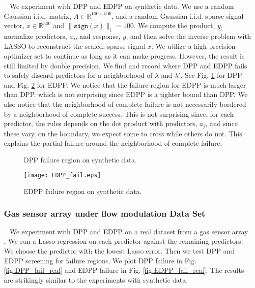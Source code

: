 \documentclass{article}
\begin{document}
\qquad ~ We experiment with DPP and EDPP on synthetic data. We use a random Gaussian i.i.d. matrix, $A\in \mathbb{R}^{100 \times 500}$, and a random Gaussian i.i.d. sparse signal vector, $x\in \mathbb{R}^{500}$ and $\|\texttt{sign}(x)\|_1=100$. We compute the product, $y$, normalize predictors, $a_j$, and response, $y$, and then solve the inverse problem with LASSO to reconstruct the scaled, sparse signal $x$. We utilize a high precision optimizer set to continue as long as it can make progress. However, the result is still limited by double precision. We find and record where DPP and EDPP fails to safely discard predictors for a neighborhood of $\lambda$ and $\lambda'$. See Fig. \ref{fig:DPP_fail} for DPP and Fig. \ref{fig:EDPP_fail} for EDPP. We notice that the failure region for EDPP is much larger than DPP, which is not surprising since EDPP is a tighter bound than DPP. We also notice that the neighborhood of complete failure is not necessarily bordered by a neighborhood of complete success. This is not surprising since, for each predictor, the rules depends on the dot product with predictors, $a_j$, and since these vary, on the boundary, we expect some to cross while others do not. This explains the partial failure around the neighborhood of complete failure. 

\begin{figure}
    \centering
    \qquad
    \caption{DPP failure region on synthetic data.}
	\label{fig:DPP_fail}
\end{figure}

\begin{figure}
    \centering
    {\texttt{[image: EDPP\_fail.eps]} }
    \caption{EDPP failure region on synthetic data.}
	\label{fig:EDPP_fail}
\end{figure}


\subsubsection*{Gas sensor array under flow modulation Data Set}

\qquad ~ We experiment with DPP and EDPP on a real dataset from a gas sensor array \cite{bioinspired}. We run a Lasso regression on each predictor against the remaining predictors. We choose the predictor with the lowest Lasso error. Then we test DPP and EDPP screening for failure regions. We plot DPP failure in Fig. \ref{fig:DPP_fail_real} and EDPP failure in Fig. \ref{fig:EDPP_fail_real}. The results are strikingly similar to the experiments with synthetic data.
\end{document}
